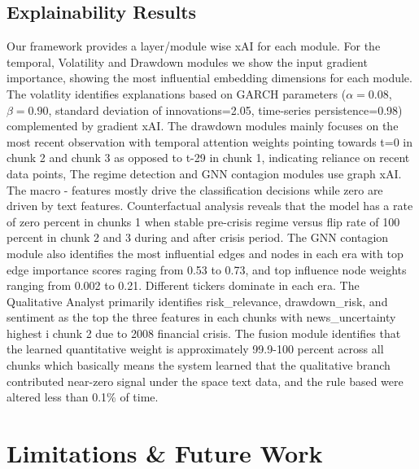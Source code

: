 \documentclass[conference]{IEEEtran}
\begin{document}
\subsection{Explainability Results}
 Our framework provides a layer/module wise xAI for each module. For the temporal, Volatility and Drawdown modules we show the input gradient importance, showing the most influential embedding dimensions for each module. The volatlity identifies explanations based on GARCH parameters  ($\alpha=0.08$, $\beta=0.90$, standard deviation of innovations=2.05, time-series persistence=0.98)  complemented by gradient xAI. The drawdown modules mainly focuses on the most recent observation with temporal attention weights pointing towards t=0 in chunk 2 and chunk 3 as opposed to t-29 in chunk 1, indicating reliance on recent data points, The regime detection and GNN contagion modules use graph xAI. The macro - features mostly drive the classification decisions while zero are driven by text features. Counterfactual analysis reveals that the model has a rate of zero percent in chunks 1 when stable pre-crisis regime versus flip rate of 100 percent in chunk 2 and 3 during and after crisis period. The GNN contagion module also identifies the most influential edges and nodes in each era with top edge importance scores raging from 0.53 to 0.73, and top influence node weights ranging from 0.002 to 0.21. Different tickers dominate in each era. The Qualitative Analyst primarily identifies risk\_relevance, drawdown\_risk, and sentiment as the top the three features in each chunks with news\_uncertainty highest i chunk 2 due to 2008 financial crisis. The fusion module identifies that the learned quantitative weight is approximately 99.9-100 percent across all chunks which basically means the system learned that the qualitative branch contributed near-zero signal under the space text data, and the rule based were altered less than 0.1\% of time. 

 
\section{Limitations \& Future Work}
\end{document}
